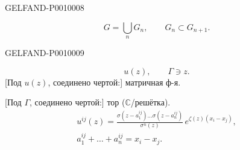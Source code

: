 \begin{GelfandAdjacentEvidence}{GELFAND-P001000}{8}

\[
G=\bigcup_n G_n,\qquad G_n\subset G_{n+1}.
\]
\end{GelfandAdjacentEvidence}
\begin{GelfandAdjacentEvidence}{GELFAND-P001000}{9}

\[
u(z),\qquad \Gamma\ni z.
\]
[Под $u(z)$, соединено чертой:] матричная ф-я.
 
[Под $\Gamma$, соединено чертой:] тор ($\mathbb C$/решётка).
\begin{gather*}
u^{ij}(z)=
\frac{\sigma(z-a_1^{ij})\ldots\sigma(z-a_n^{ij})}
{\sigma^n(z)}\,e^{\zeta(z)(x_i-x_j)},\\
a_1^{ij}+\ldots+a_n^{ij}=x_i-x_j.
\end{gather*}
\end{GelfandAdjacentEvidence}



\clearpage
{}
